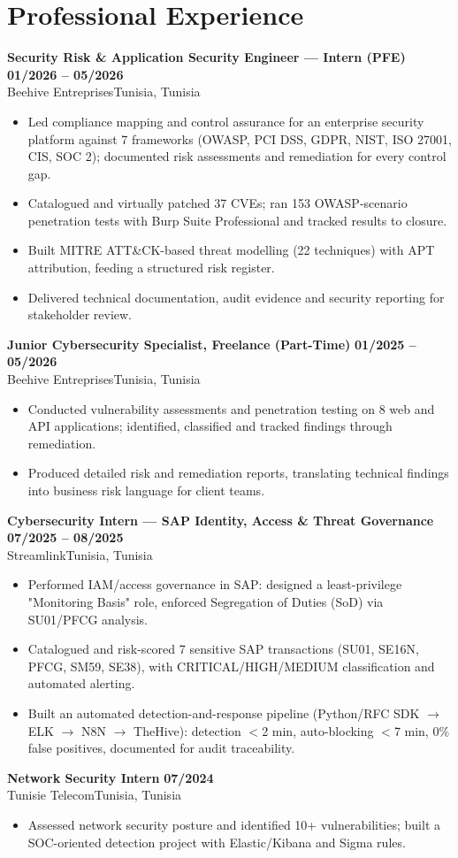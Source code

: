 \documentclass[a4paper,10pt]{article}
\newcommand{\cventry}[4]{\textbf{#1} \hfill \textbf{#4}\\[0.5pt]#2{\ifx\relax#3\relax\else, #3\fi}\par\vspace{0.8pt}}
\begin{document}
\section{Professional Experience}
\cventry{Security Risk \& Application Security Engineer --- Intern (PFE)}{Beehive Entreprises}{Tunisia}{01/2026 -- 05/2026}
\begin{itemize}
  \item Led compliance mapping and control assurance for an enterprise security platform against 7 frameworks (OWASP, PCI DSS, GDPR, NIST, ISO 27001, CIS, SOC 2); documented risk assessments and remediation for every control gap.
  \item Catalogued and virtually patched 37 CVEs; ran 153 OWASP-scenario penetration tests with Burp Suite Professional and tracked results to closure.
  \item Built MITRE ATT\&CK-based threat modelling (22 techniques) with APT attribution, feeding a structured risk register.
  \item Delivered technical documentation, audit evidence and security reporting for stakeholder review.
\end{itemize}
\cventry{Junior Cybersecurity Specialist, Freelance (Part-Time)}{Beehive Entreprises}{Tunisia}{01/2025 -- 05/2026}
\begin{itemize}
  \item Conducted vulnerability assessments and penetration testing on 8 web and API applications; identified, classified and tracked findings through remediation.
  \item Produced detailed risk and remediation reports, translating technical findings into business risk language for client teams.
\end{itemize}
\cventry{Cybersecurity Intern --- SAP Identity, Access \& Threat Governance}{Streamlink}{Tunisia}{07/2025 -- 08/2025}
\begin{itemize}
  \item Performed IAM/access governance in SAP: designed a least-privilege "Monitoring Basis" role, enforced Segregation of Duties (SoD) via SU01/PFCG analysis.
  \item Catalogued and risk-scored 7 sensitive SAP transactions (SU01, SE16N, PFCG, SM59, SE38), with CRITICAL/HIGH/MEDIUM classification and automated alerting.
  \item Built an automated detection-and-response pipeline (Python/RFC SDK $\to$ ELK $\to$ N8N $\to$ TheHive): detection $<$2 min, auto-blocking $<$7 min, 0\% false positives, documented for audit traceability.
\end{itemize}
\cventry{Network Security Intern}{Tunisie Telecom}{Tunisia}{07/2024}
\begin{itemize}
  \item Assessed network security posture and identified 10+ vulnerabilities; built a SOC-oriented detection project with Elastic/Kibana and Sigma rules.
\end{itemize}
\end{document}
